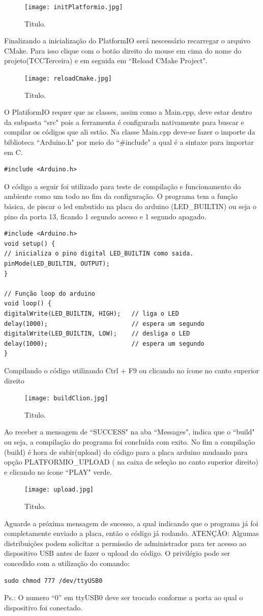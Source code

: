 \documentclass[a4paper,12pt,portuguese]{ufms-cpcx}
\begin{document}
\begin{figure}[H]	
	\centering
	\texttt{[image: initPlatformio.jpg]}
	\caption{Titulo.}
\end{figure}
Finalizando a inicialização do PlatformIO será nescessário recarregar o arquivo CMake. Para isso clique com o botão direito do mouse em cima do nome do projeto(TCCTerceira) e em seguida em ``Reload CMake Project".
\begin{figure}[H]	
	\centering
	\texttt{[image: reloadCmake.jpg]}
	\caption{Titulo.}
\end{figure}
O PlatiformIO requer que as classes, assim como a Main.cpp, deve estar dentro da subpasta ``src" pois a ferramenta é configurada nativamente para buscar e compilar os códigos que ali estão. Na classe Main.cpp deve-se fazer o importe da biblioteca ``Arduino.h" por meio do ``\#include" a qual é a sintaxe para importar em C.
\begin{lstlisting}
#include <Arduino.h>
\end{lstlisting}
O código a seguir foi utilizado para teste de compilação e funcionamento do ambiente como um todo no fim da configuração. O programa tem a função básica, de piscar o led embutido na placa do arduino (LED\_BUILTIN) ou seja o pino da porta 13, ficando 1 segundo acesso e 1 segundo apagado.

\begin{lstlisting}
#include <Arduino.h>
void setup() {
// inicializa o pino digital LED_BUILTIN como saida.
pinMode(LED_BUILTIN, OUTPUT);
}

// Função loop do arduino
void loop() {
digitalWrite(LED_BUILTIN, HIGH);   // liga o LED 
delay(1000);                       // espera um segundo
digitalWrite(LED_BUILTIN, LOW);    // desliga o LED
delay(1000);                       // espera um segundo
}
\end{lstlisting}

Compilando o código utilizando Ctrl + F9 ou clicando no ícone no canto superior direito
\begin{figure}[H]	
	\centering
	\texttt{[image: buildClion.jpg]}
	\caption{Titulo.}
\end{figure}
Ao receber a mensagem de ``SUCCESS" na aba ``Messages", indica que o ``build" ou seja, a compilação do programa foi concluída com exito.
No fim a compilação (build) é hora de subir(upload) do código para a placa arduino mudando para opção PLATFORMIO\_UPLOAD ( na caixa de seleção no canto superior direito) e clicando no ícone ``PLAY" verde.
\begin{figure}[H]	
	\centering
	\texttt{[image: upload.jpg]}
	\caption{Titulo.}
\end{figure}
Aguarde a próxima mensagem de sucesso, a qual indicando que o programa já foi completamente enviado a placa, então o código já rodando.
ATENÇÃO: Algumas distribuições podem solicitar a permissão de administrador para ter acesso ao dispositivo USB antes de fazer o upload do código. O privilégio pode ser concedido com a utilização do comando:
\begin{lstlisting}
sudo chmod 777 /dev/ttyUSB0
\end{lstlisting}
Ps.: O numero “0” em ttyUSB0 deve ser trocado conforme a porta ao qual o dispositivo foi conectado.
\end{document}
